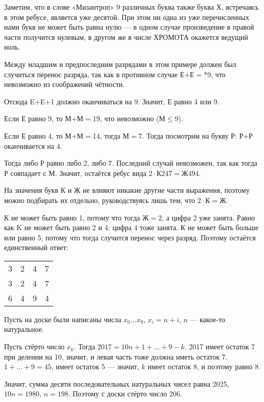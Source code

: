 \begin{itemize}

\itA Заметим, что в слове «Мизантроп» 9 различных букв\scolon а также буква Х, встречаясь в этом ребусе, является уже десятой. При этом ни одна из уже перечисленных нами букв не может быть равна нулю — в одном случае произведение в правой части получится нулевым, в другом же в числе ХРОМОТА окажется ведущий ноль.

\itB Между младшим и предпоследним разрядами в этом примере должен был случиться перенос разряда, так как в противном случае Е$+$Е$=$*9, что невозможно из соображений чётности.

Отсюда E$+$E$+$1 должно оканчиваться на 9. Значит, Е равно 4 или 9.

\subitem Если Е равно 9, то М$+$М$=$19, что невозможно (М$\le$9).

\subitem Если Е равно 4, то М$+$М$=$14, тогда М$=$7. Тогда посмотрим на букву Р: Р$+$Р оканчивается на 4.

Тогда либо Р равно либо 2, либо 7. Последний случай невозможен, так как тогда Р совпадает с М. Значит, остаётся ребус вида $2 \cdot \text{К247} = \text{Ж494}$.

На значения букв К и Ж не влияют никакие другие части выражения, поэтому можно подбирать их отдельно, руководствуясь лишь тем, что $2 \cdot \text{К} = \text{Ж}$.

К не может быть равно 1, потому что тогда $\text{Ж} = 2$, а цифра 2 уже занята. Равно как K не может быть равно 2 и 4: цифра 4 тоже занята. К не может быть больше или равно 5, потому что тогда случится перенос через разряд. Поэтому остаётся единственный ответ:

\begin{center} \begin{tabular}{cccc}
	3 & 2 & 4 & 7 \\
	3 & 2 & 4 & 7 \\ \hline
	6 & 4 & 9 & 4
\end{tabular} \end{center}

\itC Пусть на доске были написаны числа $x_0 \ldots x_9$, $x_i = n+i$, $n$ — какое-то натуральное.

Пусть стёрто число $x_k$. Тогда $2017 = 10n+ 1 + \ldots + 9 - k$. 2017 имеет остаток 7 при делении на 10, значит, и левая часть тоже должна иметь остаток 7. $1 + \ldots + 9 = 45$, имеет остаток 5 — значит, $k$ имеет остаток 8, и поэтому равно 8.

Значит, сумма десяти последовательных натуральных чисел равна 2025, $10n = 1980$, $n=198$. Поэтому с доски стёрто число 206.
\end{itemize}